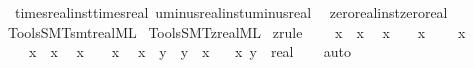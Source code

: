 \begin{isabellebody}
\ \ times{\isacharunderscore}{\kern0pt}real{\isacharunderscore}{\kern0pt}inst{\isachardot}{\kern0pt}times{\isacharunderscore}{\kern0pt}real\ uminus{\isacharunderscore}{\kern0pt}real{\isacharunderscore}{\kern0pt}inst{\isachardot}{\kern0pt}uminus{\isacharunderscore}{\kern0pt}real\isanewline
\ \ zero{\isacharunderscore}{\kern0pt}real{\isacharunderscore}{\kern0pt}inst{\isachardot}{\kern0pt}zero{\isacharunderscore}{\kern0pt}real%
\isadelimdocument
%
\endisadelimdocument
%
\isatagdocument
%
\isamarkuptrue%
%
\endisatagdocument
{\isafolddocument}%
%
\isadelimdocument
%
\endisadelimdocument
%
\isadelimML
%
\endisadelimML
%
\isatagML
{}\isamarkupfalse%
\ {\isacartoucheopen}Tools{\isacharslash}{\kern0pt}SMT{\isacharslash}{\kern0pt}smt{\isacharunderscore}{\kern0pt}real{\isachardot}{\kern0pt}ML{\isacartoucheclose}\isanewline
{}\isamarkupfalse%
\ {\isacartoucheopen}Tools{\isacharslash}{\kern0pt}SMT{\isacharslash}{\kern0pt}z{}{\isacharunderscore}{\kern0pt}real{\isachardot}{\kern0pt}ML{\isacartoucheclose}%
\endisatagML
{\isafoldML}%
%
\isadelimML
%
\endisadelimML
\isanewline
\isanewline
{}\isamarkupfalse%
\ {\isacharbrackleft}{\kern0pt}z{}{\isacharunderscore}{\kern0pt}rule{\isacharbrackright}{\kern0pt}{\isacharcolon}{\kern0pt}\isanewline
\ \ {\isachardoublequoteopen}{}\ {\isacharplus}{\kern0pt}\ x\ {\isacharequal}{\kern0pt}\ x{\isachardoublequoteclose}\isanewline
\ \ {\isachardoublequoteopen}x\ {\isacharplus}{\kern0pt}\ {}\ {\isacharequal}{\kern0pt}\ x{\isachardoublequoteclose}\isanewline
\ \ {\isachardoublequoteopen}{}\ {\isacharasterisk}{\kern0pt}\ x\ {\isacharequal}{\kern0pt}\ {}{\isachardoublequoteclose}\isanewline
\ \ {\isachardoublequoteopen}{}\ {\isacharasterisk}{\kern0pt}\ x\ {\isacharequal}{\kern0pt}\ x{\isachardoublequoteclose}\isanewline
\ \ {\isachardoublequoteopen}{\isacharminus}{\kern0pt}x\ {\isacharequal}{\kern0pt}\ {\isacharminus}{\kern0pt}{}\ {\isacharasterisk}{\kern0pt}\ x{\isachardoublequoteclose}\isanewline
\ \ {\isachardoublequoteopen}x\ {\isacharplus}{\kern0pt}\ y\ {\isacharequal}{\kern0pt}\ y\ {\isacharplus}{\kern0pt}\ x{\isachardoublequoteclose}\isanewline
\ \ \ x\ y\ {\isacharcolon}{\kern0pt}{\isacharcolon}{\kern0pt}\ real\isanewline
%
\isadelimproof
\ \ %
\endisadelimproof
%
\isatagproof
{}\isamarkupfalse%
\ auto%
\endisatagproof
{\isafoldproof}%
%
\isadelimproof
\isanewline

\end{isabellebody}

